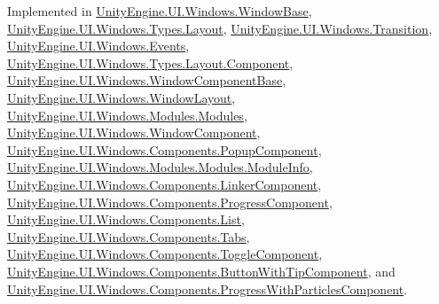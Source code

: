 Implemented in \hyperlink{class_unity_engine_1_1_u_i_1_1_windows_1_1_window_base_a563afef8016deb1af1c04e3e2f479bbf}{Unity\+Engine.\+U\+I.\+Windows.\+Window\+Base}, \hyperlink{class_unity_engine_1_1_u_i_1_1_windows_1_1_types_1_1_layout_a03cf124290d272a1796794c1ae36d970}{Unity\+Engine.\+U\+I.\+Windows.\+Types.\+Layout}, \hyperlink{class_unity_engine_1_1_u_i_1_1_windows_1_1_transition_ab2b67493b0b5aa288dbff6a4189346a8}{Unity\+Engine.\+U\+I.\+Windows.\+Transition}, \hyperlink{class_unity_engine_1_1_u_i_1_1_windows_1_1_events_ab6afde0e0eb1c10a64cff6a9ec422d44}{Unity\+Engine.\+U\+I.\+Windows.\+Events}, \hyperlink{class_unity_engine_1_1_u_i_1_1_windows_1_1_types_1_1_layout_1_1_component_a7f51276760fa744753b83f0f8514a800}{Unity\+Engine.\+U\+I.\+Windows.\+Types.\+Layout.\+Component}, \hyperlink{class_unity_engine_1_1_u_i_1_1_windows_1_1_window_component_base_a1bf684e75f1715bde930ed07d7ee6d5c}{Unity\+Engine.\+U\+I.\+Windows.\+Window\+Component\+Base}, \hyperlink{class_unity_engine_1_1_u_i_1_1_windows_1_1_window_layout_acbda7762601dfb70b5360e2744a70918}{Unity\+Engine.\+U\+I.\+Windows.\+Window\+Layout}, \hyperlink{class_unity_engine_1_1_u_i_1_1_windows_1_1_modules_1_1_modules_a6be93b010de8970042b6ee7232bc3d73}{Unity\+Engine.\+U\+I.\+Windows.\+Modules.\+Modules}, \hyperlink{class_unity_engine_1_1_u_i_1_1_windows_1_1_window_component_a1bbe16844e4db2b628587023bcc45117}{Unity\+Engine.\+U\+I.\+Windows.\+Window\+Component}, \hyperlink{class_unity_engine_1_1_u_i_1_1_windows_1_1_components_1_1_popup_component_adb7f8bbc410364dd63947a1e9c6ae220}{Unity\+Engine.\+U\+I.\+Windows.\+Components.\+Popup\+Component}, \hyperlink{class_unity_engine_1_1_u_i_1_1_windows_1_1_modules_1_1_modules_1_1_module_info_abcc1f2bc336b26add45be5e1a9ba86ac}{Unity\+Engine.\+U\+I.\+Windows.\+Modules.\+Modules.\+Module\+Info}, \hyperlink{class_unity_engine_1_1_u_i_1_1_windows_1_1_components_1_1_linker_component_a39072092da7a1f52ca8a4e14785b6daf}{Unity\+Engine.\+U\+I.\+Windows.\+Components.\+Linker\+Component}, \hyperlink{class_unity_engine_1_1_u_i_1_1_windows_1_1_components_1_1_progress_component_adfd87984504db6aff87ff639cc32310d}{Unity\+Engine.\+U\+I.\+Windows.\+Components.\+Progress\+Component}, \hyperlink{class_unity_engine_1_1_u_i_1_1_windows_1_1_components_1_1_list_a50035039b166c81742c9446b6eb72b70}{Unity\+Engine.\+U\+I.\+Windows.\+Components.\+List}, \hyperlink{class_unity_engine_1_1_u_i_1_1_windows_1_1_components_1_1_tabs_a09878546b509e7b25a479278f45f5b26}{Unity\+Engine.\+U\+I.\+Windows.\+Components.\+Tabs}, \hyperlink{class_unity_engine_1_1_u_i_1_1_windows_1_1_components_1_1_toggle_component_a5974ccee306a24708d91ed697f9e7015}{Unity\+Engine.\+U\+I.\+Windows.\+Components.\+Toggle\+Component}, \hyperlink{class_unity_engine_1_1_u_i_1_1_windows_1_1_components_1_1_button_with_tip_component_a093c510ecbdfbb5440a976320fde9ebf}{Unity\+Engine.\+U\+I.\+Windows.\+Components.\+Button\+With\+Tip\+Component}, and \hyperlink{class_unity_engine_1_1_u_i_1_1_windows_1_1_components_1_1_progress_with_particles_component_a695aed65b8ae5dc7d929f3d8a6e1a71c}{Unity\+Engine.\+U\+I.\+Windows.\+Components.\+Progress\+With\+Particles\+Component}.


